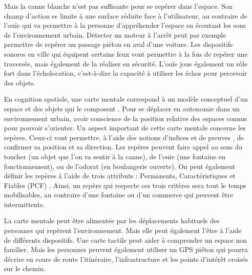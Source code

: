 Mais la canne blanche n'est pas suffisante pour se repérer dans l'espace. Son champ d'action se limite à une surface réduite face à l'utilisateur, au contraire de l'ouïe qui va permettre à la personne d'appréhender l'espace en écoutant les sons de l'environnement urbain. Détecter un moteur à l'arrêt peut par exemple permettre de repérer un passage piéton en aval d'une voiture. Les dispositifs sonores en ville qui équipent certains feux vont permettre à la fois de repérer une traversée, mais également de la réaliser en sécurité. L'ouïe joue également un rôle fort dans l'écholocation, c’est-à-dire la capacité à utiliser les échos pour percevoir des objets. \todo{}



\newpar{}

En cognition spatiale, une carte mentale correspond à un modèle conceptuel d'un espace et des objets qui le composent . Pour se déplacer en autonomie dans un environnement urbain, avoir conscience de la position relative des espaces connus pour pouvoir s'orienter. Un aspect important de cette carte mentale concerne les repères. Ceux-ci vont permettre, à l'aide des notions d'indices et de preuves , de confirmer sa position et sa direction. Les repères peuvent faire appel au sens du toucher (un objet que l'on va sentir à la canne), de l'ouïe (une fontaine en fonctionnement), ou de l'odorat (en boulangerie ouverte). On peut également définir les repères à l'aide de trois attributs : Permanents, Caractéristiques et Fiables (PCF) . Ainsi, un repère qui respecte ces trois critères sera tout le temps mobilisables, au contraire d'une fontaine ou d'un commerce qui peuvent être intermittents. 

La carte mentale peut être alimentée par les déplacements habituels des personnes qui repèrent l'environnement. Mais elle peut également l'être à l'aide de différents dispositifs. Une carte tactile peut aider à comprendre un espace non familier. Mais les personnes peuvent également utiliser un GPS piéton qui pourra décrire en cours de route l'itinéraire, l'infrastructure et les points d'intérêt croisés sur le chemin.


